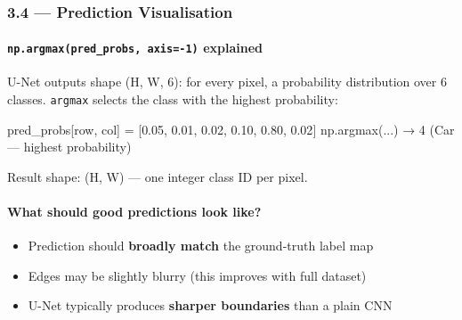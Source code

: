 \documentclass[11pt]{article}
\providecommand{\tightlist}{%
      \setlength{\itemsep}{0pt}\setlength{\parskip}{0pt}}
\newenvironment{Shaded}{}{}
\newcommand{\DecValTok}[1]{\textcolor[rgb]{0.25,0.63,0.44}{{#1}}}
\newcommand{\FloatTok}[1]{\textcolor[rgb]{0.25,0.63,0.44}{{#1}}}
\newcommand{\NormalTok}[1]{{#1}}
\newcommand{\OperatorTok}[1]{\textcolor[rgb]{0.40,0.40,0.40}{{#1}}}
\begin{document}
    \begin{center}
    \end{center}
    { \hspace*{\fill} \\}
    
    \subsubsection{3.4 --- Prediction
Visualisation}\label{prediction-visualisation}

\paragraph{\texorpdfstring{\texttt{np.argmax(pred\_probs,\ axis=-1)}
explained}{np.argmax(pred\_probs, axis=-1) explained}}\label{np.argmaxpred_probs-axis-1-explained}

U-Net outputs shape (H, W, 6): for every pixel, a probability
distribution over 6 classes. \texttt{argmax} selects the class with the
highest probability:

\begin{Shaded}
\begin{Highlighting}[]
\NormalTok{pred\_probs[row, col] }\OperatorTok{=}\NormalTok{ [}\FloatTok{0.05}\NormalTok{, }\FloatTok{0.01}\NormalTok{, }\FloatTok{0.02}\NormalTok{, }\FloatTok{0.10}\NormalTok{, }\FloatTok{0.80}\NormalTok{, }\FloatTok{0.02}\NormalTok{]}
\NormalTok{np.argmax(...)        → }\DecValTok{4}\NormalTok{    (Car — highest probability)}
\end{Highlighting}
\end{Shaded}

Result shape: (H, W) --- one integer class ID per pixel.

\paragraph{What should good predictions look
like?}\label{what-should-good-predictions-look-like}

\begin{itemize}
\tightlist
\item
  Prediction should \textbf{broadly match} the ground-truth label map
\item
  Edges may be slightly blurry (this improves with full dataset)
\item
  U-Net typically produces \textbf{sharper boundaries} than a plain CNN
\end{itemize}
\end{document}
